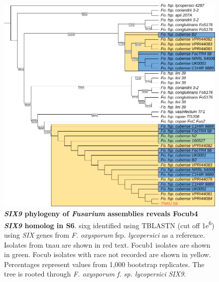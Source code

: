 \begin{figure}[htp!]
  \centering
  \includegraphics[]{Figures/FusSIX9-trimmed.phylo.pdf}
  \caption[\textit{SIX9} phylogeny of \textit{Fusarium} assemblies]{\textbf{\textit{SIX9} phylogeny of \textit{Fusarium} assemblies reveals \acl{Focub4} \textit{SIX9} homolog in S6}. \acl{sixg} identified using TBLASTN (cut off 1\-e\textsuperscript{6}) using \textit{SIX} genes from \textit{F. oxysporum} fsp. \textit{lycopersici} as a reference. Isolates from \ac{tnau} are shown in red text. \Acl{Focub1} isolates are shown in green. \acl{Focub} isolates with race not recorded are shown in yellow. Percentages represent values from 1,000 bootstrap replicates. The tree is rooted through \textit{F. oxysporum f. sp. lycopersici} \textit{SIX9}.}
  \label{fig:FusSIX9}
\end{figure}

